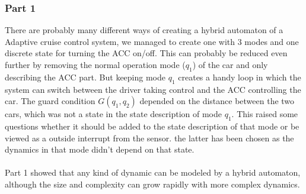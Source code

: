 \subsubsection*{Part 1}
There are probably many different ways of creating a hybrid automaton of a Adaptive cruise control system, we managed to create one with 3 modes and one discrete state for turning the ACC on/off. This can probably be reduced even further by removing the normal operation mode ($q_1$) of the car and only describing the ACC part. But keeping mode $q_1$ creates a handy loop in which the system can switch between the driver taking control and the ACC controlling the car. The guard condition $G(q_1,q_2)$ depended on the distance between the two cars, which was not a state in the state description of mode $q_1$. This raised some questions whether it should be added to the state description of that mode or be viewed as a outside interrupt from the sensor. the latter has been chosen as the dynamics in that mode didn't depend on that state.\\
\\
Part 1 showed that any kind of dynamic can be modeled by a hybrid automaton, although the size and complexity can grow rapidly with more complex dynamics.


